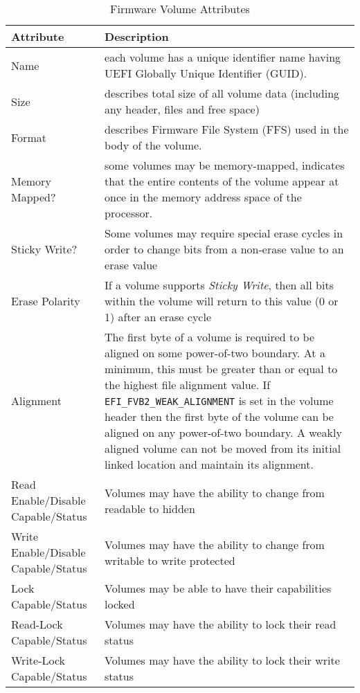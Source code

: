 \begin{table}[!htbp]
	\centering
	\renewcommand{\arraystretch}{2}
	\caption{Firmware Volume Attributes}\label{table:firmware-volume-attributes}
	\begin{tabular}{p{4cm} | p{11cm}}
		\textbf{Attribute} & \textbf{Description}
		\\ \hline \hline
		Name & each volume has a unique identifier name having UEFI Globally Unique Identifier (GUID). 
		\\ \hline
		Size & describes total size of all volume data (including any header, files and free space)
		\\ \hline
		Format & describes Firmware File System (FFS) used in the body of the volume.
		\\ \hline
		Memory Mapped? & some volumes may be memory-mapped, indicates that the entire contents of the volume appear at once in the memory address space of the processor. 
		\\ \hline
		Sticky Write? & Some volumes may require special erase cycles in order to change bits from a
		non-erase value to an erase value
		\\ \hline
		Erase Polarity & If a volume supports \textit{Sticky Write}, then all bits within the volume will return
		to this value (0 or 1) after an erase cycle
		\\ \hline
		Alignment & The first byte of a volume is required to be aligned on some power-of-two
		boundary. At a minimum, this must be greater than or equal to the highest file alignment value.
		If \verb|EFI_FVB2_WEAK_ALIGNMENT| is set in the volume header then the first byte of the volume
		can be aligned on any power-of-two boundary. A weakly aligned volume can not be moved from
		its initial linked location and maintain its alignment.
		\\ \hline
		Read Enable/Disable Capable/Status & Volumes may have the ability to change from readable
		to hidden
		\\ \hline
		Write Enable/Disable Capable/Status & Volumes may have the ability to change from writable
		to write protected
		\\ \hline
		Lock Capable/Status & Volumes may be able to have their capabilities locked
		\\ \hline
		Read-Lock Capable/Status & Volumes may have the ability to lock their read status
		\\ \hline
		Write-Lock Capable/Status & Volumes may have the ability to lock their write status
		\\ \hline
	\end{tabular}
\end{table}

